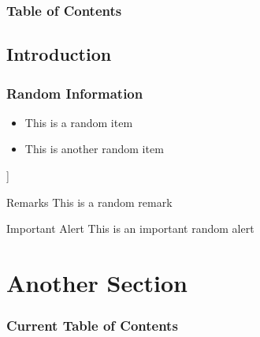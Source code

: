 \documentclass{beamer}
\title{}
\author{}
\date{}
\institute{}
\begin{document}
    \frame{\titlepage}
    \begin{frame}
        \frametitle{Table of Contents}
        \tableofcontents
    \end{frame}
    \begin{frame}
        \section{Introduction}
        \frametitle{Random Information}
        \begin{itemize}
            \item This is a random item
            \item This is another random item
        \end{itemize}]
        \begin{block}{Remarks}
            This is a random remark
        \end{block}
        \begin{alertblock}{Important Alert}
            This is an important random alert
        \end{alertblock}
    \end{frame}
    \section{Another Section}
    \begin{frame}
        \frametitle{Current Table of Contents}
        \tableofcontents[currentsection]
    \end{frame}
\end{document}
